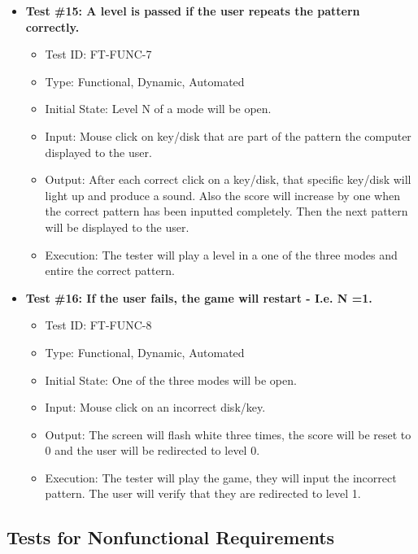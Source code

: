 \documentclass[12pt, titlepage]{article}
\begin{document}
\begin{itemize}
\item \textbf{Test \#15: A level is passed if the user repeats the pattern correctly.}
\begin{itemize}
\item Test ID: FT-FUNC-7
\item Type: Functional, Dynamic, Automated		
\item Initial State: Level N of a mode will be open. 					
\item Input: Mouse click on key/disk that are part of the pattern the computer displayed to the user.  		
\item Output: After each correct click on a key/disk, that specific key/disk will light up and produce a sound. Also the score will increase by one when the correct pattern has been inputted completely. Then the next pattern will be displayed to the user. 					
\item Execution: The tester will play a level in a one of the three modes and entire the correct pattern. 
\end{itemize}

\item \textbf{Test \#16: If the user fails, the game will restart - I.e. N =1.}
\begin{itemize}
\item Test ID: FT-FUNC-8
\item Type: Functional, Dynamic, Automated	
\item Initial State: One of the three modes will be open. 					
\item Input: Mouse click on an incorrect disk/key. 					
\item Output: The screen will flash white three times, the score will be reset to 0 and the user will be redirected to level 0.					
\item Execution: The tester will play the game, they will input the incorrect pattern. The user will verify that they are redirected to level 1.
\end{itemize}



\end{itemize}




\subsection{Tests for Nonfunctional Requirements}
\end{document}
